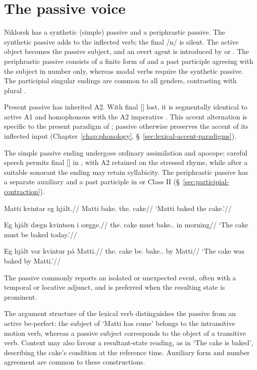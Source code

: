 \section{The passive voice}
\label{sec:passive-voice}

Niklorsk has a synthetic (simple) passive and a periphrastic passive. The synthetic passive adds  to the inflected verb; the final /n/ is silent. The active object becomes the passive subject, and an overt agent is introduced by  or . The periphrastic passive consists of a finite form of  and a past participle agreeing with the subject in number only, whereas modal verbs require the synthetic passive. The participial singular endings  are common to all genders, contrasting with plural .

Present passive  has inherited A2. With final [] lost, it is segmentally identical to active A1  and homophonous with the A2 imperative . This accent alternation is specific to the present paradigm of ; passive  otherwise preserves the accent of its inflected input (Chapter~\ref{chap:phonology}, \S~\ref{sec:lexical-accent-paradigms}).

The simple passive ending undergoes ordinary assimilation and apocope: careful speech permits final [] in , with A2 retained on the stressed rhyme, while after a suitable sonorant the ending may retain syllabicity. The periphrastic passive has a separate auxiliary and a past participle in  or Class II  (\S~\ref{sec:participial-contraction}).

\pex
\begingl
\gla Matti kvintar eg hjålt.//
\glb Matti bake.\Pst{} the.\Nt{} cake//
\glft `Matti baked the cake.'//
\endgl
\xe

\pex
\begingl
\gla Eg hjålt dægn kvintsen i sægge.//
\glb the.\Nt{} cake must bake.\Inf{}.\Pass{} in morning//
\glft `The cake must be baked today.'//
\endgl
\xe

\pex
\begingl
\gla Eg hjålt vor kvintur på Matti.//
\glb the.\Nt{} cake be.\Pst{} bake.\PstP{}.\Sg{} by Matti//
\glft `The cake was baked by Matti.'//
\endgl
\xe

The  passive commonly reports an isolated or unexpected event, often with a temporal or locative adjunct, and is preferred when the resulting state is prominent.

The argument structure of the lexical verb distinguishes the passive from an active be-perfect: the subject of  `Matti has come' belongs to the intransitive motion verb, whereas a passive subject corresponds to the object of a transitive verb. Context may also favour a resultant-state reading, as in  `The cake is baked', describing the cake's condition at the reference time. Auxiliary form and number agreement are common to these constructions.

